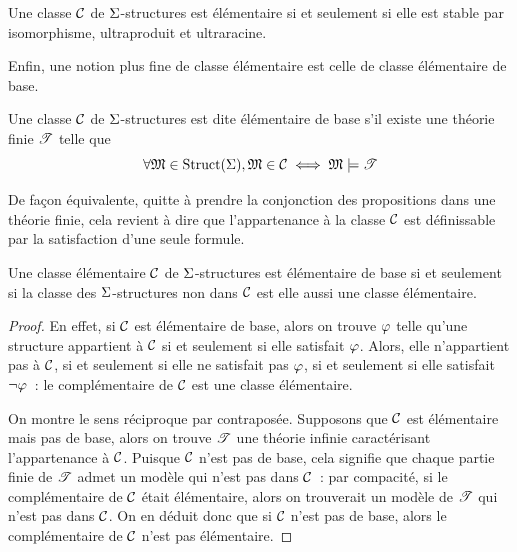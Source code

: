 \begin{corollary}
  Une classe $\mathcal{C}$ de $\Sigma$-structures est élémentaire si et seulement si
  elle est stable par isomorphisme, ultraproduit et ultraracine.
\end{corollary}

\noindent
Enfin, une notion plus fine de classe élémentaire est celle de classe
élémentaire de base.

\begin{definition}
  Une classe $\mathcal{C}$ de $\Sigma$-structures est dite élémentaire de base s'il
  existe une théorie finie $\mathscr T$ telle que
  \[\forall \mathfrak{M}\in\operatorname{Struct}(\Sigma), \mathfrak{M}\in\mathcal{C} \iff \mathfrak{M}\models\mathscr T\]
\end{definition}

\begin{remark}
  De façon équivalente, quitte à prendre la conjonction des propositions dans
  une théorie finie, cela revient à dire que l'appartenance à la classe $\mathcal{C}$
  est définissable par la satisfaction d'une seule formule.
\end{remark}

\begin{proposition}
  Une classe élémentaire $\mathcal{C}$ de $\Sigma$-structures est élémentaire de base
  si et seulement si la classe des $\Sigma$-structures non dans $\mathcal{C}$ est
  elle aussi une classe élémentaire.
\end{proposition}

\begin{proof}
  En effet, si $\mathcal{C}$ est élémentaire de base, alors on trouve $\varphi$
  telle qu'une structure appartient à $\mathcal{C}$ si et seulement si elle
  satisfait $\varphi$. Alors, elle n'appartient pas à $\mathcal{C}$, si et seulement
  si elle ne satisfait pas $\varphi$,  si et seulement si elle
  satisfait $\lnot\varphi$~: le complémentaire de $\mathcal{C}$ est une classe
  élémentaire.

  On montre le sens réciproque par contraposée. Supposons que $\mathcal{C}$
  est élémentaire mais pas de base, alors on trouve $\mathscr T$ une théorie
  infinie caractérisant l'appartenance à $\mathcal{C}$. Puisque $\mathcal{C}$ n'est
  pas de base, cela signifie que chaque partie finie de $\mathscr T$ admet un
  modèle qui n'est pas dans $\mathcal{C}$~: par compacité, si le complémentaire de
  $\mathcal{C}$ était élémentaire, alors on trouverait un modèle de $\mathscr T$ qui
  n'est pas dans $\mathcal{C}$. On en déduit donc que si $\mathcal{C}$ n'est pas de base,
  alors le complémentaire de $\mathcal{C}$ n'est pas élémentaire.
\end{proof}

